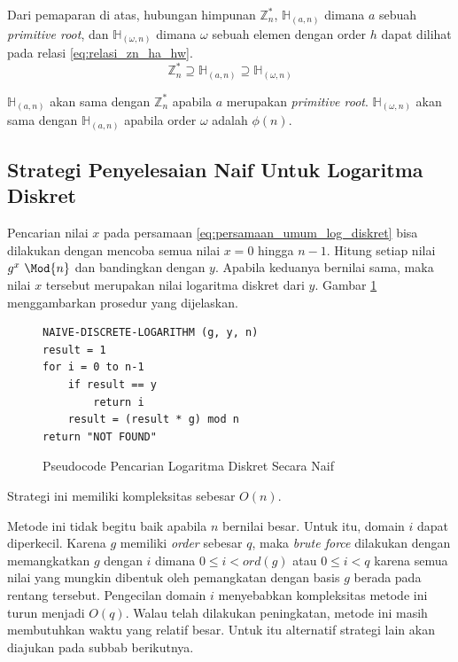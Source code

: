 Dari pemaparan di atas, hubungan himpunan $ \mathbb{Z}_n^* $, $ \mathbb{H}_{(a, n)} $ dimana $ a $ sebuah \textit{primitive root}, dan $ \mathbb{H}_{(\omega, n)} $ dimana $ \omega $ sebuah elemen dengan order $ h $ dapat dilihat pada relasi \eqref{eq:relasi_zn_ha_hw}.
\begin{equation}
\mathbb{Z}_n^*\supseteq \mathbb{H}_{(a, n)} \supseteq \mathbb{H}_{(\omega, n)}
\label{eq:relasi_zn_ha_hw}
\end{equation}

$ \mathbb{H}_{(a, n)} $ akan sama dengan $ \mathbb{Z}_n^* $ apabila $ a $ merupakan \textit{primitive root}. $ \mathbb{H}_{(\omega, n)} $ akan sama dengan $ \mathbb{H}_{(a, n)} $ apabila order $ {\omega} $ adalah $ \phi(n) $.

\subsection{ Strategi Penyelesaian Naif Untuk Logaritma Diskret}
Pencarian nilai $ x $ pada persamaan \eqref{eq:persamaan_umum_log_diskret} bisa dilakukan dengan mencoba semua nilai $ x = 0 $ hingga $ n-1 $. Hitung setiap nilai $ g^x\ \Mod{n} $ dan bandingkan dengan $ y $. Apabila keduanya bernilai sama, maka nilai $ x $ tersebut merupakan nilai logaritma diskret dari $ y $. Gambar \ref{psdo:disc_log_naive} menggambarkan prosedur yang dijelaskan.
\begin{figure}[h!]
\begin{lstlisting}[firstnumber=0]
NAIVE-DISCRETE-LOGARITHM (g, y, n)
result = 1
for i = 0 to n-1
	if result == y
		return i
	result = (result * g) mod n
return "NOT FOUND"
\end{lstlisting}
\caption{Pseudocode Pencarian Logaritma Diskret Secara Naif}
\label{psdo:disc_log_naive}
\end{figure}
Strategi ini memiliki kompleksitas sebesar $ O(n) $.

Metode ini tidak begitu baik apabila $ n $ bernilai besar. Untuk itu, domain $ i $ dapat diperkecil. Karena $ g $ memiliki \textit{order} sebesar $ q $, maka \textit{brute force} dilakukan dengan memangkatkan $ g $ dengan $ i $ dimana $ 0\leq i < ord(g) $ atau $ 0 \leq i < q $ karena semua nilai yang mungkin dibentuk oleh pemangkatan dengan basis $ g $ berada pada rentang tersebut. Pengecilan domain $ i $ menyebabkan kompleksitas metode ini turun menjadi $ O(q) $. Walau telah dilakukan peningkatan, metode ini masih membutuhkan waktu yang relatif besar. Untuk itu alternatif strategi lain akan diajukan pada subbab berikutnya.

